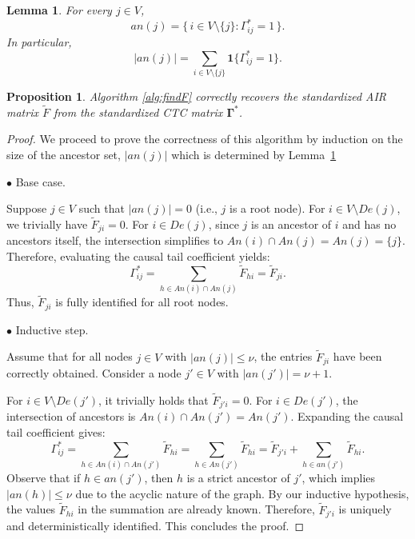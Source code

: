 \documentclass[10pt,a4paper]{amsart}
\newtheorem{lemma}{Lemma}
\newtheorem{proposition}{Proposition}
\begin{document}
\begin{lemma}\label{lem:ancestor_set_gamma}
For every $j \in V$,
\begin{equation}
an(j)= \{\, i \in V \setminus \{j\} : \Gamma^*_{ij}=1 \,\}.
\end{equation}
In particular,
\begin{equation}
|an(j)| = \sum_{i \in V \setminus \{j\}} \mathbf{1}\{\Gamma^*_{ij}=1\}.
\end{equation}
\end{lemma}

\begin{proposition}\label{Pro:alg}
Algorithm \ref{alg:findF} correctly recovers the standardized   AIR matrix $\widetilde{F}$    from the standardized CTC  matrix $\boldsymbol{\Gamma}^*$.
\end{proposition}

\begin{proof} 
    We proceed to prove the correctness of this algorithm by induction on the size of the ancestor set, $|{an}(j)|$ which is determined by  Lemma~\ref{lem:ancestor_set_gamma}
    
    $\bullet$  Base case. 
    
    Suppose $j \in V$ such that $|{an}(j)| = 0$ (i.e., $j$ is a root node). For $i \in V \setminus {De}(j)$, we trivially have $\widetilde{F}_{ji} = 0$. For $i \in {De}(j)$, since $j$ is an ancestor of $i$ and has no ancestors itself, the intersection simplifies to ${An}(i) \cap {An}(j) = {An}(j) = \{j\}$. Therefore, evaluating the causal tail coefficient yields:
    \[
        \Gamma^*_{ij} = \sum_{h \in {An}(i) \cap {An}(j)} \widetilde{F}_{hi} = \widetilde{F}_{ji}.
    \]
    Thus, $\widetilde{F}_{ji}$ is fully identified for all root nodes.
    
     $\bullet$   Inductive step.
     
     Assume that for all nodes $j \in V$ with $|{an}(j)| \le \nu$, the entries $\widetilde{F}_{ji}$ have been correctly obtained. Consider a node $j' \in V$ with $|{an}(j')| = \nu + 1$. 
    
    For $i \in V \setminus {De}(j')$, it trivially holds that $\widetilde{F}_{j'i} = 0$. For $i \in {De}(j')$, the intersection of ancestors is ${An}(i) \cap {An}(j') = {An}(j')$. Expanding the causal tail coefficient gives:
    \[
        \Gamma^*_{ij} = \sum_{h \in {An}(i) \cap {An}(j')} \widetilde{F}_{hi} = \sum_{h \in {An}(j')} \widetilde{F}_{hi} = \widetilde{F}_{j'i} + \sum_{h \in {an}(j')} \widetilde{F}_{hi}.
    \]
    Observe that if $h \in {an}(j')$, then $h$ is a strict ancestor of $j'$, which  implies $|{an}(h)| \le \nu$ due to the acyclic nature of the graph. By our inductive hypothesis, the values $\widetilde{F}_{hi}$ in the summation are already known. Therefore, $\widetilde{F}_{j'i}$ is uniquely and deterministically identified. This concludes the proof.



    
\end{proof}
\end{document}
